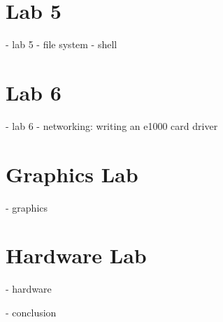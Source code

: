 \documentclass{article}
\begin{document}
\section{Lab 5}
- lab 5
	- file system
	- shell


\section{Lab 6}
- lab 6
	- networking: writing an e1000 card driver


\section{Graphics Lab}
- graphics

\section{Hardware Lab}
- hardware



- conclusion





\end{document}
